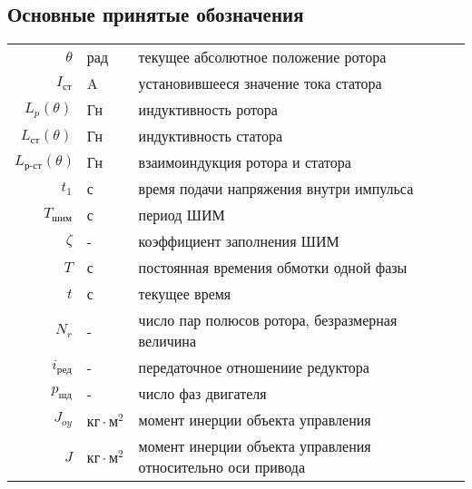 \newpage
\subsection{ Основные принятые обозначения }

\begin{table}[ht!]
    \begin{tabular}{rll}
    $\theta$            & рад & текущее абсолютное положение ротора \\

    $I_{\text{ст}}$     & A & установившееся значение тока статора \\

    $L_{p}(\theta)$     & Гн & индуктивность ротора \\

    $L_{\text{ст}}(\theta)$     & Гн & индуктивность статора \\

    $L_{\text{р-ст}}(\theta)$   & Гн & взаимоиндукция ротора и статора \\

    $t_{1}$             & с & время подачи напряжения внутри импульса \\

    $T_\text{шим}$      & с & период ШИМ \\

    $\zeta$             & - & коэффициент заполнения ШИМ \\

    $T$                 & с & постоянная времения обмотки одной фазы \\

    $t$                 & с & текущее время \\

    $N_{r}$             & - & число пар полюсов ротора, безразмерная величина \\

    $i_\text{ред}$      & - & передаточное отношениие редуктора \\

    $p_{\text{шд}}$     & - & число фаз двигателя \\

    $J_{oy}$            & $\text{кг} \cdot \text{м}^{2}$ & момент инерции объекта управления \\

    $J$                 & $\text{кг} \cdot \text{м}^{2}$ & момент инерции объекта управления относительно оси привода \\


\end{tabular}
\end{table}

